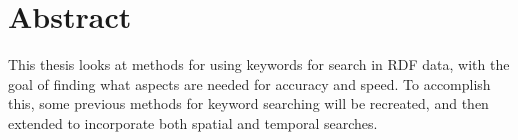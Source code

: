 \section*{Abstract}
This thesis looks at methods for using keywords for search in RDF data, with the goal of finding what aspects are needed for accuracy and speed. To accomplish this, some previous methods for keyword searching will be recreated, and then extended to incorporate both spatial and temporal searches. 